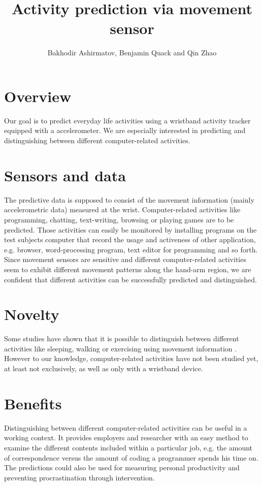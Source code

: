 \documentclass[11pt,a4paper]{paper}
\title{Activity prediction via movement sensor}
\author{Bakhodir Ashirmatov, Benjamin Quack and Qin Zhao}
\begin{document}
\maketitle

\section{Overview}

Our goal is to predict everyday life activities using a wristband activity tracker equipped 
 with a accelerometer.
We are especially interested in predicting and distinguishing between 
 different computer-related activities.
 
\section{Sensors and data}
 
The predictive data is supposed to consist of the movement information (mainly accelerometric data) 
 measured at the wrist.
Computer-related activities like programming, chatting, text-writing,
 browsing or playing games are to be predicted.
Those activities can easily be monitored by installing programs on the 
 test subjects computer that record the usage and activeness of other 
 application, e.g. browser, word-processing program, text editor for programming 
 and so forth.
Since movement sensors are sensitive and different computer-related activities
 seem to exhibit different movement patterns along the hand-arm region, 
 we are confident that different activities can be
 successfully predicted and distinguished.
 
 
\section{Novelty}

Some studies have shown that it is possible to distinguish between different 
 activities like sleeping, walking or exercising using movement information 
 \cite{banosetal2014}.
However to our knowledge, computer-related activities have not been studied yet, 
 at least not exclusively, as well as only with a wristband device.
  
  
\section{Benefits}

Distinguishing between different computer-related activities can be
 useful in a working context. 
It provides employers and researcher with an easy method to examine 
 the different contents included within a particular job, e.g.
 the amount of correspondence versus the amount of coding a programmer 
 spends his time on.
The predictions could also be used for measuring personal productivity 
 and preventing procrastination through intervention.




\end{document}
